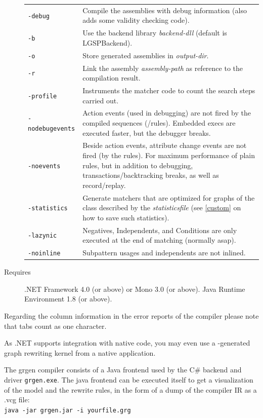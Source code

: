 \begin{description}
\begin{tabularx}{\linewidth}{lX}
      \texttt{-debug} & Compile the assemblies with debug information (also adds some validity checking code).\\
      \texttt{-b} & Use the backend library \emph{backend-dll} (default is LGSPBackend).\\
      \texttt{-o} & Store generated assemblies in \emph{output-dir}.\\
      \texttt{-r} & Link the assembly \emph{assembly-path} as reference to the compilation result.\\
      \texttt{-profile} & Instruments the matcher code to count the search steps carried out.\\
      \texttt{-nodebugevents} & Action events (used in debugging) are not fired by the compiled sequences (/rules). Embedded execs are executed faster, but the debugger breaks.\\
      \texttt{-noevents} & Beside action events, attribute change events are not fired (by the rules). For maximum performance of plain rules, but in addition to debugging, transactions/backtracking breaks, as well as record/replay.\\
      \texttt{-statistics} & Generate matchers that are optimized for graphs of the class described by the \emph{statisticsfile} (see \ref{custom} on how to save such statistics).\\
      \texttt{-lazynic} & Negatives, Independents, and Conditions are only executed at the end of matching (normally asap).\\
      \texttt{-noinline} & Subpattern usages and independents are not inlined.\\
    \end{tabularx}
  \item[Requires] .NET Framework 4.0 (or above) or Mono 3.0 (or above). Java Runtime Environment 1.8 (or above).
\end{description}

\begin{note}
Regarding the column information in the error reports of the compiler please note that tabs count as one character.
\end{note}

\begin{note}
As .NET supports integration with native code, you may even use a \GrG-generated graph rewriting kernel from a native application.
\end{note}

\begin{note}\label{note:modelruledump}
The grgen compiler consists of a Java frontend used by the C\# backend and driver \texttt{grgen.exe}.
The java frontend can be executed itself to get a visualization of the model and the rewrite rules,
in the form of a dump of the compiler IR as a .vcg file:\\
\texttt{java -jar grgen.jar -i yourfile.grg}
\end{note}

